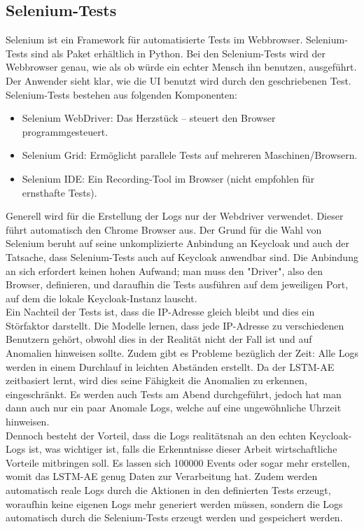 \documentclass[a4paper,12pt]{article}
\begin{document}
	\subsection{Selenium-Tests}
	Selenium ist ein Framework für automatisierte Tests im Webbrowser. Selenium-Tests sind als Paket erhältlich in Python. Bei den Selenium-Tests wird der Webbrowser genau, wie als ob  würde ein echter Mensch ihn benutzen, ausgeführt. Der Anwender sieht klar, wie die UI benutzt wird durch den geschriebenen Test. Selenium-Tests bestehen aus folgenden Komponenten:
	\begin{itemize}
		\item Selenium WebDriver: Das Herzstück – steuert den Browser programmgesteuert.
		\item Selenium Grid: Ermöglicht parallele Tests auf mehreren Maschinen/Browsern.
		\item Selenium IDE: Ein Recording-Tool im Browser (nicht empfohlen für ernsthafte Tests).
	\end{itemize}
	Generell wird für die Erstellung der Logs nur der Webdriver verwendet. Dieser führt automatisch den Chrome Browser aus. Der Grund für die Wahl von Selenium beruht auf seine unkomplizierte Anbindung an Keycloak und auch der Tatsache, dass Selenium-Tests auch auf Keycloak anwendbar sind. Die Anbindung an sich erfordert keinen hohen Aufwand; man muss den "Driver", also den Browser, definieren, und daraufhin die Tests ausführen auf dem jeweiligen Port, auf dem die lokale Keycloak-Instanz lauscht.
	\\[0.5em]
	Ein Nachteil der Tests ist, dass die IP-Adresse gleich bleibt und dies ein Störfaktor darstellt. Die Modelle lernen, dass jede IP-Adresse zu verschiedenen Benutzern gehört, obwohl dies in der Realität nicht der Fall ist und auf Anomalien hinweisen sollte. Zudem gibt es Probleme bezüglich der Zeit: Alle Logs werden in einem Durchlauf in leichten Abständen erstellt. Da der LSTM-AE zeitbasiert lernt, wird dies seine Fähigkeit die Anomalien zu erkennen, eingeschränkt. Es werden auch Tests am Abend durchgeführt, jedoch hat man dann auch nur ein paar Anomale Logs, welche auf eine ungewöhnliche Uhrzeit hinweisen. 
	\\[0.5em]
	Dennoch besteht der Vorteil, dass die Logs realitätsnah an den echten Keycloak-Logs ist, was wichtiger ist, falls die Erkenntnisse dieser Arbeit wirtschaftliche Vorteile mitbringen soll. Es lassen sich 100000 Events oder sogar mehr erstellen, womit das LSTM-AE genug Daten zur Verarbeitung hat. Zudem werden automatisch reale Logs durch die Aktionen in den definierten Tests erzeugt, woraufhin keine eigenen Logs mehr generiert werden müssen, sondern die Logs automatisch durch die Selenium-Tests erzeugt werden und gespeichert werden. 
	\\[0.5em]
	
\end{document}

